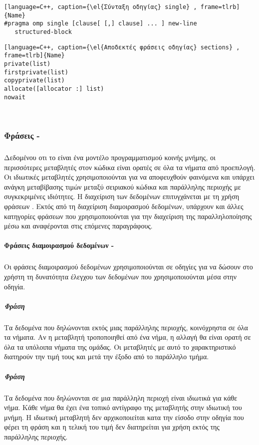 \begin{lstlisting}[language=C++, caption={\el{Σύνταξη οδηγίας} single} , frame=tlrb]{Name} 
#pragma omp single [clause[ [,] clause] ... ] new-line 
   structured-block
\end{lstlisting}

\begin{lstlisting}[language=C++, caption={\el{Αποδεκτές φράσεις οδηγίας} sections} , frame=tlrb]{Name}
private(list) 
firstprivate(list) 
copyprivate(list) 
allocate([allocator :] list) 
nowait
\end{lstlisting}
\ \\
\subsubsection{Φράσεις - }
\subparagraph{}
Δεδομένου οτι το \emph{} είναι ένα μοντέλο προγραμματισμού κοινής μνήμης, οι περισσότερες μεταβλητές στον κώδικα \emph{} είναι ορατές σε όλα τα νήματα από προεπιλογή. Οι ιδιωτικές μεταβλητές χρησιμοποιούνται για να αποφευχθούν φαινόμενα  \emph{} και υπάρχει ανάγκη μεταβίβασης τιμών μεταξύ σειριακού κώδικα και παράλληλης περιοχής με συγκεκριμένες ιδιότητες. Η διαχείριση των δεδομένων επιτυγχάνεται με τη χρήση φράσεων \emph{}. 
Εκτός από τη διαχείριση διαμοιρασμού δεδομένων, υπάρχουν και άλλες κατηγορίες φράσεων που χρησιμοποιούνται για την διαχείριση της παραλληλοποίησης μέσω \emph{} και αναφέρονται στις επόμενες παραγράφους.


\clearpage
\paragraph{Φράσεις διαμοιρασμού δεδομένων - }
\subparagraph{}
Οι φράσεις διαμοιρασμού δεδομένων χρησιμοποιούνται σε οδηγίες για να δώσουν στο χρήστη τη δυνατότητα έλεγχου των δεδομένων που χρησιμοποιούνται μέσα στην οδηγία.

\subparagraph{Φράση \emph{}}
\subparagraph{}
Τα δεδομένα που δηλώνονται εκτός μιας παράλληλης περιοχής, κοινόχρηστα σε όλα τα νήματα. Αν η μεταβλητή τροποποιηθεί από ένα νήμα, η αλλαγή θα είναι ορατή σε όλα τα υπόλοιπα νήματα της ομάδας. Οι μεταβλητές με αυτό το χαρακτηριστικό διατηρούν την τιμή τους και μετά την έξοδο από το παράλληλο τμήμα.

\subparagraph{Φράση \emph{}}
\subparagraph{}
Τα δεδομένα που δηλώνονται σε μια παράλληλη περιοχή είναι ιδιωτικά για κάθε νήμα. Κάθε νήμα θα έχει ένα τοπικό αντίγραφο της μεταβλητής στην ιδιωτική του μνήμη. Η ιδιωτική μεταβλητή δεν αρχικοποιείται κατα την είσοδο στην οδηγία που φέρει τη φράση \emph{} και η τελική του τιμή δεν διατηρείται για χρήση εκτός της παράλληλης περιοχής.

